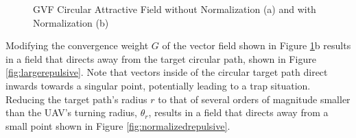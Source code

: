 \documentclass[numbered,pdftex]{ohio-etd}
\begin{document}
\begin{figure}[H]
	\begin{subfigmatrix}{2}%
		\centering	
		\hspace*{0mm}
	\end{subfigmatrix}
	\caption{GVF Circular Attractive Field without Normalization (a) and with Normalization (b)}
	\label{fig:gvfCircAttractive}
\end{figure}

Modifying the convergence weight $G$ of the vector field shown in Figure \ref{fig:gvfCircAttractive}b results in a field that directs away from the target circular path, shown in Figure \ref{fig:largerepulsive}. Note that vectors inside of the circular target path direct inwards towards a singular point, potentially leading to a trap situation. Reducing the target path's radius $r$ to that of several orders of magnitude smaller than the UAV's turning radius, $\theta_r$, results in a field that directs away from a small point shown in Figure \ref{fig:normalizedrepulsive}.
\end{document}
